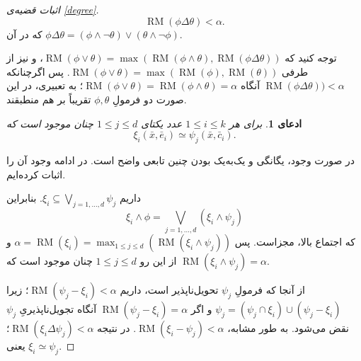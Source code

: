 \documentclass[12pt,a4paper]{report}
\theoremstyle{colorhead}
\newtheorem{claim}[thm]{ادعای}
\DeclareMathOperator{\RM}{RM}
\begin{document}
\begin{proof}[اثبات قضیه‌ی 
\ref{degree}]
\[\RM(\phi\Delta \theta)<\alpha.
\]
که در آن 
$\phi\Delta \theta =(\phi\wedge \neg \theta)\vee (\theta\wedge\neg \phi)$.
\par 
توجه کنید که 
$\RM(\phi\vee \theta)=\max(\RM(\phi\wedge\theta), \RM (\phi\Delta\theta))$،
و نیز از طرفی
\mbox{$\RM(\phi\vee \theta)=\max(\RM(\phi),\RM(\theta))$}.
پس اگرچنانکه 
$\RM (\phi\Delta\theta))<\alpha$
آنگاه 
\mbox{$\RM(\phi\vee \theta)=\RM(\phi\wedge\theta)=\alpha$؛}
به تعبیری، در این صورت دو فرمولِ
$\phi,\theta$
تقریباً بر هم منطبقند. 
\begin{claim}
	برای هر
	$1\leq i\leq k$
	عدد یکتای
	$1\leq j\leq d$
	چنان موجود است که
	\[
	\xi_i(\bar{x},\bar{e}_i)\simeq \psi_j(\bar{x},\bar{c}_i).
	\]
	\end{claim}
در صورت وجود، یگانگی و یک‌به‌یک بودن چنین تابعی واضح است. در ادامه وجود آن را اثبات کرده‌ایم.
\par 
داریم
$\xi_i\subseteq \bigvee_{j=1,\ldots,d}\psi_j$.
بنابراین
\[
\xi_i\wedge\phi=\bigvee_{j=1,\ldots,d}(\xi_i\wedge\psi_j)
\]
که اجتماع بالا، مجزاست. پس 
$\alpha=\RM(\xi_i)=\max_{1\leq j\leq d} (\RM(\xi_i\wedge\psi_j))$
و از این رو
$1\leq j\leq d$
چنان موجود است که
$\RM(\xi_i\wedge\psi_j)=\alpha$.
\par 
از آنجا که فرمولِ
$\psi_j$
تحویل‌ناپذیر است، داریم
$\RM(\psi_j-\xi_i)<\alpha$؛
زیرا 
\mbox{$\psi_j=(\psi_j\cap \xi_i)\cup (\psi_j-\xi_i)$}
و اگر
$\RM(\psi_j-\xi_i)=\alpha$
آنگاه تجویل‌ناپذیریِ
$\psi_j$
نقض می‌شود.  به طور مشابه،
$\RM(\xi_i-\psi_j)<\alpha$.
در نتیجه
$\RM(\xi_i\Delta\psi_j)<\alpha$؛
یعنی
$\xi_i\simeq \psi_j$.
	\end{proof}
\pagebreak
\end{document}
